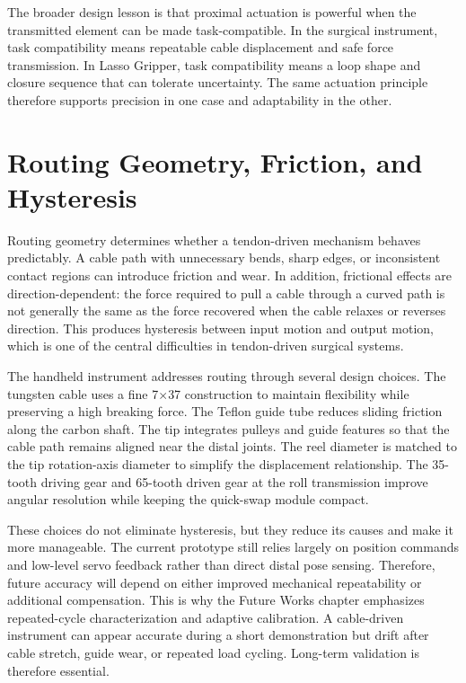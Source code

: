 The broader design lesson is that proximal actuation is powerful when the transmitted element can be made task-compatible. In the surgical instrument, task compatibility means repeatable cable displacement and safe force transmission. In Lasso Gripper, task compatibility means a loop shape and closure sequence that can tolerate uncertainty. The same actuation principle therefore supports precision in one case and adaptability in the other.

\section{Routing Geometry, Friction, and Hysteresis}

Routing geometry determines whether a tendon-driven mechanism behaves predictably. A cable path with unnecessary bends, sharp edges, or inconsistent contact regions can introduce friction and wear. In addition, frictional effects are direction-dependent: the force required to pull a cable through a curved path is not generally the same as the force recovered when the cable relaxes or reverses direction. This produces hysteresis between input motion and output motion, which is one of the central difficulties in tendon-driven surgical systems.

The handheld instrument addresses routing through several design choices. The tungsten cable uses a fine 7$\times$37 construction to maintain flexibility while preserving a high breaking force. The Teflon guide tube reduces sliding friction along the carbon shaft. The tip integrates pulleys and guide features so that the cable path remains aligned near the distal joints. The reel diameter is matched to the tip rotation-axis diameter to simplify the displacement relationship. The 35-tooth driving gear and 65-tooth driven gear at the roll transmission improve angular resolution while keeping the quick-swap module compact.

These choices do not eliminate hysteresis, but they reduce its causes and make it more manageable. The current prototype still relies largely on position commands and low-level servo feedback rather than direct distal pose sensing. Therefore, future accuracy will depend on either improved mechanical repeatability or additional compensation. This is why the Future Works chapter emphasizes repeated-cycle characterization and adaptive calibration. A cable-driven instrument can appear accurate during a short demonstration but drift after cable stretch, guide wear, or repeated load cycling. Long-term validation is therefore essential.

